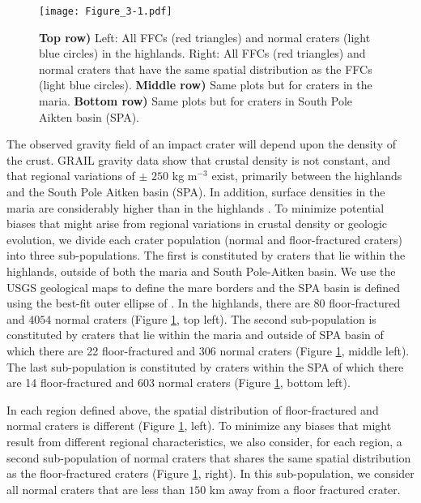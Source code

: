 \begin{figure}[h!]
  \graphicspath{ {/Users/thorey/Documents/These/Projet/FFC/Gravi_GRAIL/Article/Papier/SOUMISSION_2_EPSL/} }
  \begin{center}

    \texttt{[image: Figure\_3-1.pdf]}
    \caption{\textbf{Top  row)} Left:  All  FFCs  (red triangles)  and
      normal craters (light blue circles) in the highlands. Right: All
      FFCs  (red triangles)  and  normal craters  that  have the  same
      spatial    distribution     as    the    FFCs     (light    blue
      circles). \textbf{Middle row)} Same plots but for craters in the
      maria.  \textbf{Bottom row)} Same plots but for craters in South
      Pole Aikten basin (SPA).}
    \label{Figure3-1}
  \end{center}
\end{figure}

The observed  gravity field of an  impact crater will depend  upon the
density of the crust. GRAIL gravity  data show that crustal density is
not constant, and that regional  variations of $\pm$ $250$ kg m$^{-3}$
exist, primarily between the highlands and the South Pole Aitken basin
(SPA). In  addition, surface densities  in the maria  are considerably
higher  than in  the highlands  \citep{Besserer:2014jr}.  To  minimize
potential biases that might arise  from regional variations in crustal
density  or  geologic  evolution,  we divide  each  crater  population
(normal and floor-fractured craters)  into three sub-populations.  The
first is constituted by craters that lie within the highlands, outside
of  both the  maria  and South  Pole-Aitken basin.   We  use the  USGS
geological  maps to  define  the mare  borders and  the  SPA basin  is
defined      using     the      best-fit     outer      ellipse     of
\citet{GarrickBethell:2009dx}.   In  the  highlands,  there  are  $80$
floor-fractured and $4054$ normal craters (Figure \ref{Figure3-1}, top
left).  The second  sub-population is constituted by  craters that lie
within  the maria  and outside  of  SPA basin  of which  there are  22
floor-fractured and 306 normal craters (Figure \ref{Figure3-1}, middle
left).  The last  sub-population is constituted by  craters within the
SPA  of which  there are  14  floor-fractured and  603 normal  craters
(Figure \ref{Figure3-1}, bottom left).
	 
In   each  region   defined   above,  the   spatial  distribution   of
floor-fractured    and   normal    craters   is    different   (Figure
\ref{Figure3-1}, left).  To minimize any biases that might result from
different regional characteristics, we also consider, for each region,
a second sub-population of normal craters that shares the same spatial
distribution as  the floor-fractured craters  (Figure \ref{Figure3-1},
right).  In this  sub-population, we consider all  normal craters that
are less than $150$ km away from a floor fractured crater.

